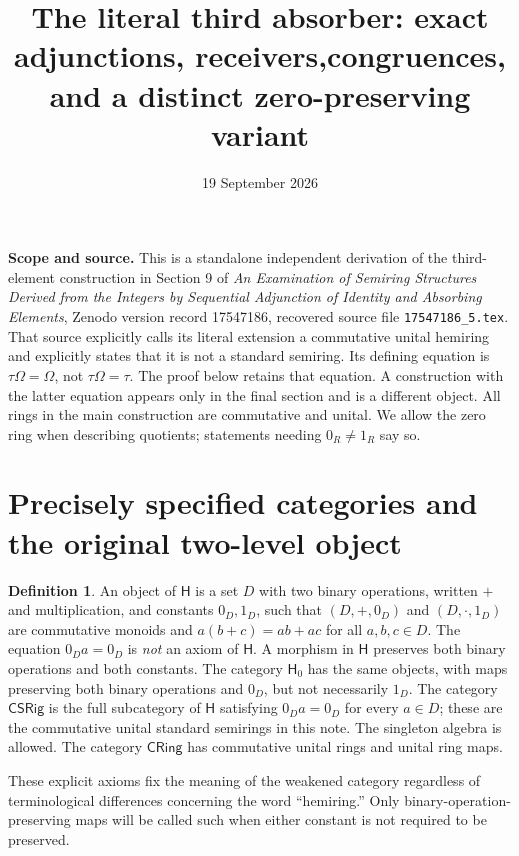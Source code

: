 \documentclass[11pt]{article}
\title{The literal third absorber: exact adjunctions, receivers,\newline congruences, and a distinct zero-preserving variant}
\author{}
\date{19 September 2026}
\theoremstyle{definition}
\newtheorem{definition}[theorem]{Definition}
\newcommand{\HH}{\mathsf H}
\newcommand{\HHZ}{\mathsf H_0}
\newcommand{\SSS}{\mathsf{CSRig}}
\newcommand{\CR}{\mathsf{CRing}}
\newcommand{\Om}{\Omega}
\begin{document}
\maketitle

\noindent\textbf{Scope and source.}
This is a standalone independent derivation of the third-element construction
in Section 9 of \emph{An Examination of Semiring Structures Derived from the
Integers by Sequential Adjunction of Identity and Absorbing Elements},
Zenodo version record 17547186, recovered source file
\texttt{17547186\_5.tex}. That source explicitly calls its literal extension a
commutative unital hemiring and explicitly states that it is not a standard
semiring. Its defining equation is \(\tau\Om=\Om\), not \(\tau\Om=\tau\).
The proof below retains that equation. A construction with the latter equation
appears only in the final section and is a different object.
All rings in the main construction are commutative and unital. We allow the
zero ring when describing quotients; statements needing \(0_R\ne1_R\) say so.

\section{Precisely specified categories and the original two-level object}

\begin{definition}\label{def:categories}
An object of \(\HH\) is a set \(D\) with two binary operations, written
\(+\) and multiplication, and constants \(0_D,1_D\), such that
\((D,+,0_D)\) and \((D,\cdot,1_D)\) are commutative monoids and
\(a(b+c)=ab+ac\) for all \(a,b,c\in D\).
The equation \(0_Da=0_D\) is \emph{not} an axiom of \(\HH\).
A morphism in \(\HH\) preserves both binary operations and both constants.
The category \(\HHZ\) has the same objects, with maps preserving both binary
operations and \(0_D\), but not necessarily \(1_D\).
The category \(\SSS\) is the full subcategory of \(\HH\) satisfying
\(0_Da=0_D\) for every \(a\in D\); these are the commutative unital
standard semirings in this note. The singleton algebra is allowed.
The category \(\CR\) has commutative unital rings and unital ring maps.
\end{definition}

These explicit axioms fix the meaning of the weakened category regardless of
terminological differences concerning the word ``hemiring.''
Only binary-operation-preserving maps will be called such when either constant
is not required to be preserved.
\end{document}

